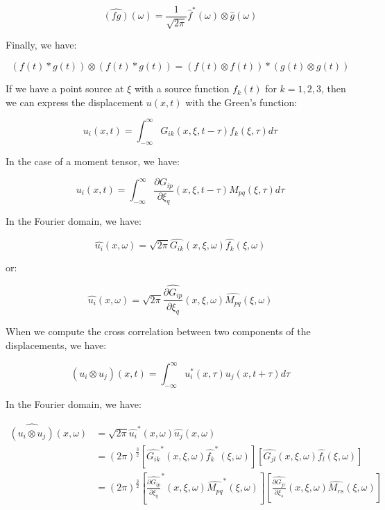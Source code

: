 \documentclass[methods.tex]{subfiles}
\begin{document}
\begin{equation}
\hat{(f g)} (\omega) = \frac{1}{\sqrt{2 \pi}} \hat{f}^* (\omega) \otimes \hat{g} (\omega)
\end{equation}

Finally, we have:

\begin{equation}
(f(t) * g(t)) \otimes (f(t) * g(t)) = (f(t) \otimes f(t)) * (g(t) \otimes g(t))
\end{equation}

If we have a point source at $\xi$ with a source function $f_k (t)$ for $k = 1, 2, 3$, then we can express the displacement $u(x, t)$ with the Green's function:

\begin{equation}
u_i(x, t) = \int_{- \infty}^{\infty} G_{ik} (x, \xi, t - \tau) f_k (\xi, \tau) d\tau
\end{equation}

In the case of a moment tensor, we have:

\begin{equation}
u_i(x, t) = \int_{- \infty}^{\infty} \frac{\partial G_{ip} }{\partial \xi_q} (x, \xi, t - \tau) M_{pq} (\xi, \tau) d\tau
\end{equation}

In the Fourier domain, we have:

\begin{equation}
\hat{u_i} (x, \omega) = \sqrt{2 \pi} \hat{G_{ik}} (x, \xi, \omega) \hat{f_k} (\xi, \omega)
\end{equation}

or:

\begin{equation}
\hat{u_i} (x, \omega) = \sqrt{2 \pi} \hat{\frac{\partial G_{ip}}{\partial \xi_q} } (x, \xi, \omega) \hat{M_{pq}} (\xi, \omega)
\end{equation}

When we compute the cross correlation between two components of the displacements, we have:

\begin{equation}
(u_i \otimes u_j) (x, t) = \int_{- \infty}^{\infty} u_i^* (x, \tau) u_j (x, t + \tau) d\tau
\end{equation}

In the Fourier domain, we have:

\begin{equation}
\begin{split}
\hat{(u_i \otimes u_j)} (x, \omega) & = \sqrt{2 \pi} \hat{u_i}^* (x, \omega) \hat{u_j} (x, \omega) \\
                                        & = (2 \pi)^{\frac{3}{2}} [\hat{G_{ik}}^* (x, \xi, \omega) \hat{f_k}^* (\xi, \omega)] [\hat{G_{jl}} (x, \xi, \omega) \hat{f_l} (\xi, \omega)] \\
                                        & = (2 \pi)^{\frac{3}{2}} [\hat{\frac{\partial G_{ip}}{\partial \xi_q}}^* (x, \xi, \omega) \hat{M_{pq}}^* (\xi, \omega)] [\hat{\frac{\partial G_{jr}}{\partial \xi_s}} (x, \xi, \omega) \hat{M_{rs}} (\xi, \omega)] 
\end{split}
\end{equation}
\end{document}
